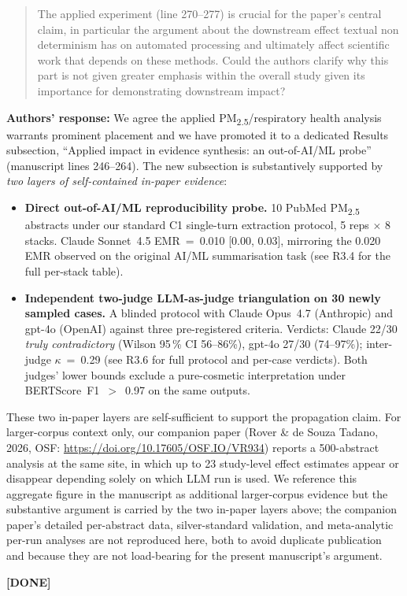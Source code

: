 \documentclass[11pt,a4paper]{article}
\newenvironment{revquote}{%
  \begin{quote}\small\itshape\color{revgray}
}{%
  \end{quote}
}
\newcommand{\response}[1]{\par\noindent\textbf{\color{revgreen}Authors' response:} #1\par}
\newcommand{\done}{\color{revgreen}\textbf{[DONE]}}
\begin{document}
\begin{revquote}
The applied experiment (line 270--277) is crucial for the paper's central claim, in particular the argument about the downstream effect textual non determinism has on automated processing and ultimately affect scientific work that depends on these methods. Could the authors clarify why this part is not given greater emphasis within the overall study given its importance for demonstrating downstream impact?
\end{revquote}

\response{We agree the applied PM\textsubscript{2.5}/respiratory health analysis warrants prominent placement and we have promoted it to a dedicated Results subsection, ``Applied impact in evidence synthesis: an out-of-AI/ML probe'' (manuscript lines 246--264). The new subsection is substantively supported by \emph{two layers of self-contained in-paper evidence}:

\begin{itemize}[leftmargin=*]
  \item \textbf{Direct out-of-AI/ML reproducibility probe.} 10 PubMed PM\textsubscript{2.5} abstracts under our standard C1 single-turn extraction protocol, 5 reps $\times$ 8 stacks. Claude Sonnet~4.5 EMR~=~0.010 [0.00, 0.03], mirroring the 0.020 EMR observed on the original AI/ML summarisation task (see R3.4 for the full per-stack table).
  \item \textbf{Independent two-judge LLM-as-judge triangulation on 30 newly sampled cases.} A blinded protocol with Claude Opus~4.7 (Anthropic) and gpt-4o (OpenAI) against three pre-registered criteria. Verdicts: Claude 22/30 \emph{truly contradictory} (Wilson 95\,\% CI 56--86\%), gpt-4o 27/30 (74--97\%); inter-judge $\kappa$~=~0.29 (see R3.6 for full protocol and per-case verdicts). Both judges' lower bounds exclude a pure-cosmetic interpretation under BERTScore~F1~$>$~0.97 on the same outputs.
\end{itemize}

These two in-paper layers are self-sufficient to support the propagation claim. For larger-corpus context only, our companion paper (Rover \& de Souza Tadano, 2026, OSF: \url{https://doi.org/10.17605/OSF.IO/VR934}) reports a 500-abstract analysis at the same site, in which up to 23 study-level effect estimates appear or disappear depending solely on which LLM run is used. We reference this aggregate figure in the manuscript as additional larger-corpus evidence but the substantive argument is carried by the two in-paper layers above; the companion paper's detailed per-abstract data, silver-standard validation, and meta-analytic per-run analyses are not reproduced here, both to avoid duplicate publication and because they are not load-bearing for the present manuscript's argument.} \done
\end{document}
